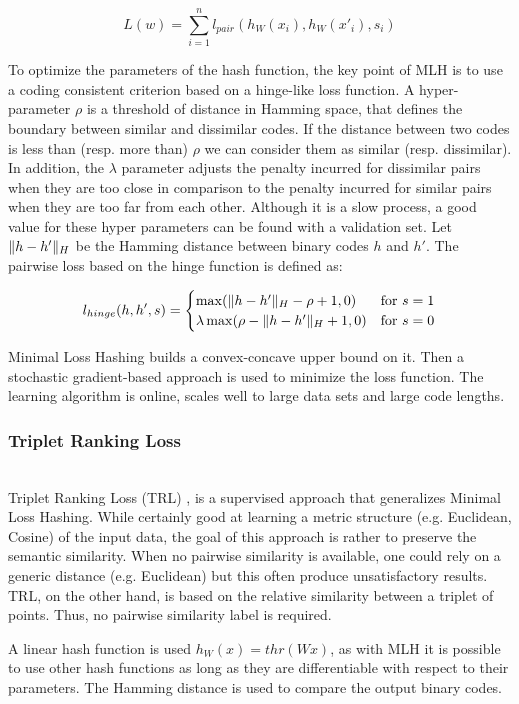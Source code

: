 \[L(w)=\sum\limits_{i=1}^n l_{pair}(h_W(x_i), h_W(x'_i), s_i)\]

To optimize the parameters of the hash function, the key point of MLH is to use a coding consistent criterion based on a hinge-like loss function. A hyper-parameter $\rho$ is a threshold of distance in Hamming space, that defines the boundary between similar and dissimilar codes. If the distance between two codes is less than (resp. more than) $\rho$ we can consider them as similar (resp. dissimilar). In addition, the $\lambda$ parameter adjusts the penalty incurred for dissimilar pairs when they are too close in comparison to the penalty incurred for similar pairs when they are too far from each other. Although it is a slow process, a good value for these hyper parameters can be found with a validation set. Let $\lVert h - h'\rVert_{H}$ be the Hamming distance between binary codes $h$ and $h'$. The pairwise loss based on the hinge function is defined as:

\[
	l_{hinge}(h, h', s)=
	\begin{cases}
	\max(\lVert h - h'\rVert_{H} - \rho + 1, 0) & \text{for } s=1 \\
	\lambda\max(\rho - \lVert h - h'\rVert_{H} + 1, 0) & \text{for } s=0
	\end{cases}
\]

Minimal Loss Hashing builds a convex-concave upper bound on it. Then a stochastic gradient-based approach is used to minimize the loss function. The learning algorithm is online, scales well to large data sets and large code lengths.

\subsubsection{Triplet Ranking Loss}
~\\
Triplet Ranking Loss (TRL) \cite{norouzi2012hamming},\cite{norouzi2016} is a supervised approach that generalizes Minimal Loss Hashing. While certainly good at learning a metric structure (e.g. Euclidean, Cosine) of the input data, the goal of this approach is rather to preserve the semantic similarity. When no pairwise similarity is available, one could rely on a generic distance (e.g. Euclidean) but this often produce unsatisfactory results. TRL, on the other hand, is based on the relative similarity between a triplet of points. Thus, no pairwise similarity label is required.

A linear hash function is used $h_W(x)=thr(Wx)$, as with MLH it is possible to use other hash functions as long as they are differentiable with respect to their parameters. The Hamming distance is used to compare the output binary codes.

